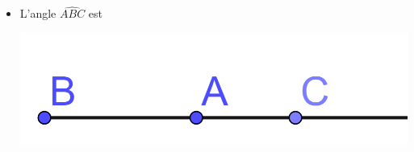 \documentclass[12pt,a4paper]{article}
\begin{document}
\begin{myexs}
	\begin{itemize}
		
		
		
		
		\item L'angle $\widehat{ABC}$ est 
		\begin{center}
			\includegraphics[scale=0.2]{angle_nul}
		\end{center}
		
\end{itemize}
\end{myexs}
\end{document}
